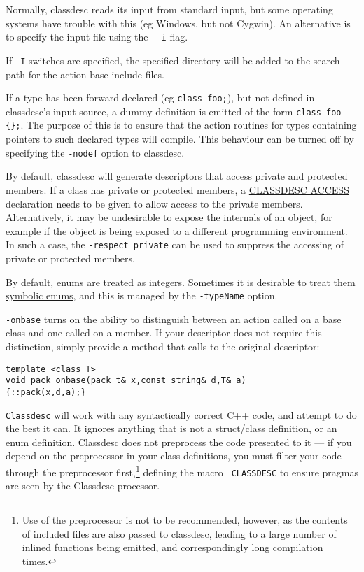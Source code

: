 Normally, classdesc reads its input from standard input, but some
operating systems have trouble with this (eg Windows, but not
Cygwin). An alternative is to specify the input file using the {\tt
  -i} flag.

If {\tt -I} switches are specified, the specified directory will be
added to the search path for the action base include files.

If a type has been forward declared (eg \verb+class foo;+), but not
defined in classdesc's input source, a dummy definition is emitted of
the form \verb+class foo {};+. The purpose of this is to ensure that
the action routines for types containing pointers to such declared
types will compile. This behaviour can be turned off by specifying the
\verb+-nodef+ option to classdesc.

By default, classdesc will generate descriptors that access private
and protected members. If a class has private or protected members, a
\hyperref{{\tt CLASSDESC\_ACCESS}}{ (see
  \S}{)}{CLASSDESC ACCESS} declaration needs
to be given to allow access to the private members. Alternatively, it
may be undesirable to expose the internals of an object, for example
if the object is being exposed to a different programming
environment. In such a case, the
\verb+-respect_private+ can be used to
suppress the accessing of private or protected members.

By default, enums are treated as integers. Sometimes it is desirable
to treat them \hyperref{symbolically}{ (see \S}{)}{symbolic enums}, and
this is managed by the \verb+-typeName+ option.

\verb+-onbase+ turns on the ability to distinguish between an action
called on a base class and one called on a member. If your descriptor
does not require this distinction, simply provide a method that calls
to the original descriptor:
\begin{verbatim}
template <class T>
void pack_onbase(pack_t& x,const string& d,T& a)
{::pack(x,d,a);}
\end{verbatim} 


{\tt Classdesc} will work with any syntactically correct C++ code, and
attempt to do the best it can. It ignores anything that is not a
struct/class definition, or an enum definition. Classdesc
does not preprocess the code presented to it --- if you depend on the
preprocessor in your class definitions, you must filter your code
through the preprocessor first,\footnote{Use of
the preprocessor is not to be recommended, however, as the contents of
included files are also passed to classdesc, leading to a large number
of inlined functions being emitted, and correspondingly long
compilation times.} defining the macro
\verb+_CLASSDESC+ to ensure pragmas are seen by the
Classdesc processor.

